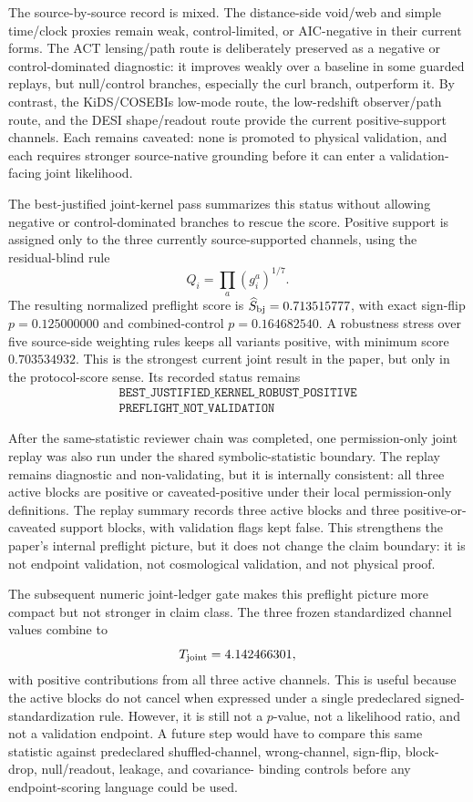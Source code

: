The source-by-source record is mixed.  The distance-side void/web and simple
time/clock proxies remain weak, control-limited, or AIC-negative in their current
forms.  The ACT lensing/path route is deliberately preserved as a negative or
control-dominated diagnostic: it improves weakly over a baseline in some guarded
replays, but null/control branches, especially the curl branch, outperform it.
By contrast, the KiDS/COSEBIs low-mode route, the low-redshift observer/path
route, and the DESI shape/readout route provide the current positive-support
channels.  Each remains caveated: none is promoted to physical validation, and
each requires stronger source-native grounding before it can enter a validation-
facing joint likelihood.

The best-justified joint-kernel pass summarizes this status without allowing
negative or control-dominated branches to rescue the score.  Positive support is
assigned only to the three currently source-supported channels, using the
residual-blind rule
\[
  Q_i=\prod_a (g_i^a)^{1/7}.
\]
The resulting normalized preflight score is
\(\widehat S_{\rm bj}=0.713515777\), with exact sign-flip
\(p=0.125000000\) and combined-control \(p=0.164682540\).  A robustness stress
over five source-side weighting rules keeps all variants positive, with minimum
score \(0.703534932\).  This is the strongest current joint result in the paper,
but only in the protocol-score sense.  Its recorded status remains
\[
\begin{gathered}
\texttt{BEST\_JUSTIFIED\_KERNEL\_ROBUST\_POSITIVE}\\
\texttt{PREFLIGHT\_NOT\_VALIDATION}
\end{gathered}
\]

After the same-statistic reviewer chain was completed, one permission-only
joint replay was also run under the shared symbolic-statistic boundary.  The
replay remains diagnostic and non-validating, but it is internally consistent:
all three active blocks are positive or caveated-positive under their local
permission-only definitions.  The replay summary records three active blocks
and three positive-or-caveated support blocks, with validation flags kept false.
This strengthens the paper's internal preflight picture, but it does not change
the claim boundary: it is not endpoint validation, not cosmological validation,
and not physical proof.

The subsequent numeric joint-ledger gate makes this preflight picture more
compact but not stronger in claim class.  The three frozen standardized channel
values combine to
\[
  T_{\rm joint}=4.142466301 ,
\]
with positive contributions from all three active channels.  This is useful
because the active blocks do not cancel when expressed under a single
predeclared signed-standardization rule.  However, it is still not a \(p\)-value,
not a likelihood ratio, and not a validation endpoint.  A future step would
have to compare this same statistic against predeclared shuffled-channel,
wrong-channel, sign-flip, block-drop, null/readout, leakage, and covariance-
binding controls before any endpoint-scoring language could be used.

